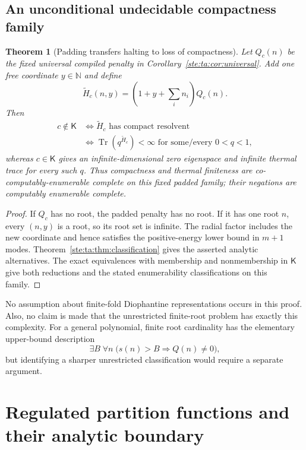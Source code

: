 \documentclass[11pt,letterpaper]{article}
\newtheorem{theorem}{Theorem}[section]
\theoremstyle{definition}
\theoremstyle{remark}
\newcommand{\N}{\mathbb N}
\DeclareMathOperator{\Tr}{Tr}
\begin{document}
\subsection{An unconditional undecidable compactness family}
\begin{theorem}[Padding transfers halting to loss of compactness]\label{ste:ta:thm:padding}
Let $Q_c(n)$ be the fixed universal compiled penalty in Corollary~\ref{ste:ta:cor:universal}. Add one free coordinate $y\in\N$ and define
\begin{equation}\label{ste:ta:eq:padding}
\widetilde H_c(n,y)=\left(1+y+\sum_i n_i\right)Q_c(n).
\end{equation}
Then
\begin{align*}
c\notin\mathsf K
&\Longleftrightarrow \widetilde H_c\text{ has compact resolvent}\\
&\Longleftrightarrow \Tr(q^{\widetilde H_c})<\infty\text{ for some/every }0<q<1,
\end{align*}
whereas $c\in\mathsf K$ gives an infinite-dimensional zero eigenspace and infinite thermal trace for every such $q$. Thus compactness and thermal finiteness are co-computably-enumerable complete on this fixed padded family; their negations are computably enumerable complete.
\end{theorem}
\begin{proof}
If $Q_c$ has no root, the padded penalty has no root. If it has one root $n$, every $(n,y)$ is a root, so its root set is infinite. The radial factor includes the new coordinate and hence satisfies the positive-energy lower bound in $m+1$ modes. Theorem~\ref{ste:ta:thm:classification} gives the asserted analytic alternatives. The exact equivalences with membership and nonmembership in $\mathsf K$ give both reductions and the stated enumerability classifications on this family.
\end{proof}

No assumption about finite-fold Diophantine representations occurs in this proof. Also, no claim is made that the unrestricted finite-root problem has exactly this complexity. For a general polynomial, finite root cardinality has the elementary upper-bound description
\[
\exists B\;\forall n\;\bigl(s(n)>B\Longrightarrow Q(n)\ne0\bigr),
\]
but identifying a sharper unrestricted classification would require a separate argument.

\section{Regulated partition functions and their analytic boundary}
\end{document}
